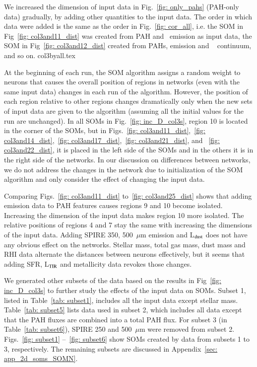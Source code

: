             We increased the dimension of input data in Fig.~\ref{fig: only_pahs} (PAH-only data) gradually, by adding other quantities to the input data. 
            The order in which data were added is the same as the order in Fig.~\ref{fig: cor_all}, i.e. the SOM in Fig~\ref{fig: col3and11_dist} was created from PAH and \halpha\ emission as input data, the SOM in Fig~\ref{fig: col3and12_dist} created from PAHs, \halpha emission and \sii~ continuum, and so on. 
            {col3byall.tex}
            
            At the beginning of each run, the SOM algorithm assigns a random weight to neurons that causes the overall position of regions in networks (even with the same input data) changes in each run of the algorithm.
            However, the position of each region relative to other regions changes dramatically only when the new sets of input data are given to the algorithm (assuming all the initial values for the run are unchanged).
            In all SOMs in Fig.~\ref{fig: inc_D_col3s}, region 10 is located in the corner of the SOMs, but in  Figs.~\ref{fig: col3and11_dist},~\ref{fig: col3and14_dist},~\ref{fig: col3and17_dist},~\ref{fig: col3and21_dist}, and ~\ref{fig: col3and22_dist}, it is placed in the left side of the SOMs and in the others it is in the right side of the networks.
            In our discussion on differences between networks, we do not address the changes in the network due to initialization of the SOM algorithm and only consider the effect of changing the input data.
            
            Comparing Figs.~\ref{fig: col3and11_dist} to~\ref{fig: col3and25_dist} shows that adding \halpha emission data to PAH features causes regions 9 and 10 become isolated. 
            Increasing the dimension of the input data makes region 10 more isolated.
            The relative positions of regions 4 and 7 stay the same with increasing the dimensions of the input data. 
            Adding SPIRE 350, 500~$\mu$m emission and L$_{\rm dust}$ does not have any obvious effect on the networks.
            Stellar mass, total gas mass, dust mass and RHI data alternate the distances between neurons effectively, but it seems that adding SFR, L$_{\rm TIR}$ and metallicity data revokes those changes.
            
            We generated other subsets of the data based on the results in Fig~\ref{fig: inc_D_col3s} to further study the effects of the input data on SOMs.
            Subset 1, listed in Table~\ref{tab: subset1}, includes all the input data except stellar mass.
            Table~\ref{tab: subset5} lists data used in subset 2, which includes all data except that the PAH fluxes are combined into a total PAH flux. 
            For subset 3 (in Table~\ref{tab: subset6}), SPIRE 250 and 500~$\mu$m were removed from subset 2.
            Figs.~\ref{fig: subset1} --~\ref{fig: subset6} show SOMs created by data from subsets 1 to 3, respectively.
            The remaining subsets are discussed in Appendix~\ref{sec: app_2d_soms_SOMN}.

